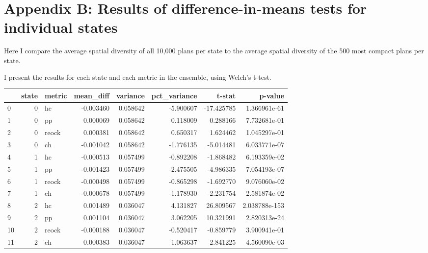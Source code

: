 \documentclass[]{article}
\begin{document}
\hypertarget{appendix-b-results-of-difference-in-means-tests-for-individual-states}{%
\section{Appendix B: Results of difference-in-means tests for individual
states}\label{appendix-b-results-of-difference-in-means-tests-for-individual-states}}

Here I compare the average spatial diversity of all 10,000 plans per
state to the average spatial diversity of the 500 most compact plans per
state.

I present the results for each state and each metric in the ensemble,
using Welch's t-test.

\begin{tabular}{lrlrrrrr}
\toprule
{} &  state & metric &  mean\_diff &  variance &  pct\_variance &      t-stat &        p-value \\
\midrule
0  &      0 &     hc &  -0.003460 &  0.058642 &     -5.900607 &  -17.425785 &   1.366961e-61 \\
1  &      0 &     pp &   0.000069 &  0.058642 &      0.118009 &    0.288166 &   7.732681e-01 \\
2  &      0 &  reock &   0.000381 &  0.058642 &      0.650317 &    1.624462 &   1.045297e-01 \\
3  &      0 &     ch &  -0.001042 &  0.058642 &     -1.776135 &   -5.014481 &   6.033771e-07 \\
4  &      1 &     hc &  -0.000513 &  0.057499 &     -0.892208 &   -1.868482 &   6.193359e-02 \\
5  &      1 &     pp &  -0.001423 &  0.057499 &     -2.475505 &   -4.986335 &   7.054193e-07 \\
6  &      1 &  reock &  -0.000498 &  0.057499 &     -0.865298 &   -1.692770 &   9.076060e-02 \\
7  &      1 &     ch &  -0.000678 &  0.057499 &     -1.178930 &   -2.231754 &   2.581874e-02 \\
8  &      2 &     hc &   0.001489 &  0.036047 &      4.131827 &   26.809567 &  2.038788e-153 \\
9  &      2 &     pp &   0.001104 &  0.036047 &      3.062205 &   10.321991 &   2.820313e-24 \\
10 &      2 &  reock &  -0.000188 &  0.036047 &     -0.520417 &   -0.859779 &   3.900941e-01 \\
11 &      2 &     ch &   0.000383 &  0.036047 &      1.063637 &    2.841225 &   4.560090e-03 \\

\end{tabular}
\end{document}
